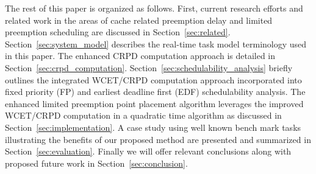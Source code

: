 The rest of this paper is organized as follows. First, current research efforts and related work in the areas of cache related preemption delay and limited preemption scheduling are discussed in Section~\ref{sec:related}.  Section~\ref{sec:system_model} describes the real-time task model terminology used in this paper.  The enhanced CRPD computation approach is detailed in Section~\ref{sec:crpd_computation}. Section~\ref{sec:schedulability_analysis} briefly outlines the integrated WCET/CRPD computation approach incorporated into fixed priority (FP) and earliest deadline first (EDF) schedulability analysis.  The enhanced limited preemption point placement algorithm leverages the improved WCET/CRPD computation in a quadratic time algorithm as discussed in Section~\ref{sec:implementation}.  A case study using well known bench mark tasks illustrating the benefits of our proposed method are presented and summarized in Section~\ref{sec:evaluation}.  Finally we will offer relevant conclusions along with proposed future work in Section~\ref{sec:conclusion}. 